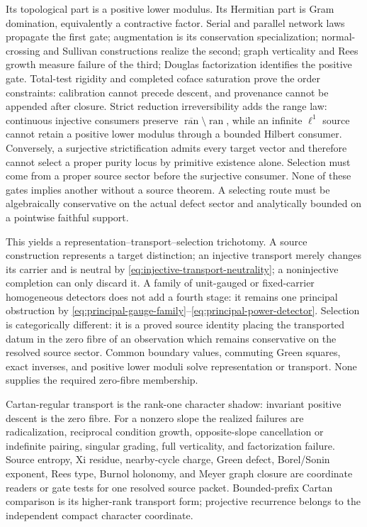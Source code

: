 \documentclass[11pt]{article}
\theoremstyle{definition}
\theoremstyle{remark}
\begin{document}
Its topological part is a positive lower modulus.  Its Hermitian part is
Gram domination, equivalently a contractive factor.  Serial and parallel
network laws propagate the first gate; augmentation is its conservation
specialization; normal-crossing and Sullivan constructions realize the
second; graph verticality and Rees growth measure failure of the third;
Douglas factorization identifies the positive gate.  Total-test rigidity
and completed coface saturation prove the order constraints: calibration
cannot precede descent, and provenance cannot be appended after closure.
Strict reduction irreversibility adds the range law: continuous injective
consumers preserve \(\overline{\operatorname{ran}}\setminus
\operatorname{ran}\), while an infinite \(\ell^1\) source cannot retain a
positive lower modulus through a bounded Hilbert consumer.  Conversely, a
surjective strictification admits every target vector and therefore cannot
select a proper purity locus by primitive existence alone.  Selection must
come from a proper source sector before the surjective consumer.
None of these gates implies another without a source theorem.  A selecting
route must be algebraically conservative on the actual defect sector and
analytically bounded on a pointwise faithful support.

This yields a representation--transport--selection trichotomy.  A source
construction represents a target distinction; an injective transport merely
changes its carrier and is neutral by
\eqref{eq:injective-transport-neutrality}; a noninjective completion can only
discard it.  A family of unit-gauged or fixed-carrier homogeneous detectors
does not add a fourth stage: it remains one principal obstruction by
\eqref{eq:principal-gauge-family}--\eqref{eq:principal-power-detector}.
Selection is categorically different: it is a proved source
identity placing the transported datum in the zero fibre of an observation
which remains conservative on the resolved source sector.  Common boundary
values, commuting Green squares, exact inverses, and positive lower moduli
solve representation or transport.  None supplies the required zero-fibre
membership.

Cartan-regular transport is the rank-one character shadow: invariant
positive descent is the zero fibre.  For a nonzero slope the realized
failures are radicalization, reciprocal condition growth, opposite-slope
cancellation or indefinite pairing, singular grading, full verticality,
and factorization failure.  Source entropy, Xi residue, nearby-cycle charge,
Green defect, Borel/Sonin exponent, Rees type, Burnol holonomy, and Meyer
graph closure are coordinate readers or gate tests for one resolved source
packet.  Bounded-prefix Cartan comparison is its higher-rank transport
form; projective recurrence belongs to the independent compact character
coordinate.
\end{document}
